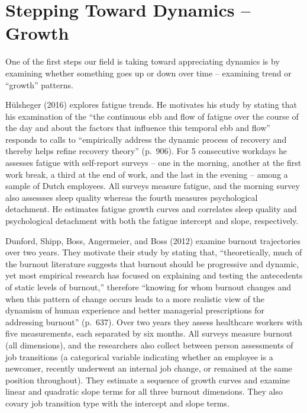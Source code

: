 \documentclass[english,,man]{apa6}
\theoremstyle{definition}
\theoremstyle{definition}
\theoremstyle{definition}
\theoremstyle{remark}
\begin{document}
\hypertarget{stepping-toward-dynamics-growth}{%
\section{Stepping Toward Dynamics --
Growth}\label{stepping-toward-dynamics-growth}}

One of the first steps our field is taking toward appreciating dynamics
is by examining whether something goes up or down over time -- examining
trend or \enquote{growth} patterns.

Hülsheger (2016) explores fatigue trends. He motivates his study by
stating that his examination of the \enquote{the continuous ebb and flow
of fatigue over the course of the day and about the factors that
influence this temporal ebb and flow} responds to calls to
\enquote{empirically address the dynamic process of recovery and thereby
helps refine recovery theory} (p.~906). For 5 consecutive workdays he
assesses fatigue with self-report surveys -- one in the morning, another
at the first work break, a third at the end of work, and the last in the
evening -- among a sample of Dutch employees. All surveys measure
fatigue, and the morning survey also assessses sleep quality whereas the
fourth measures psychological detachment. He estimates fatigue growth
curves and correlates sleep quality and psychological detachment with
both the fatigue intercept and slope, respectively.

Dunford, Shipp, Boss, Angermeier, and Boss (2012) examine burnout
trajectories over two years. They motivate their study by stating that,
\enquote{theoretically, much of the burnout literature suggests that
burnout should be progressive and dynamic, yet most empirical research
has focused on explaining and testing the antecedents of static levels
of burnout,} therefore \enquote{knowing for whom burnout changes and
when this pattern of change occurs leads to a more realistic view of the
dynamism of human experience and better managerial prescriptions for
addressing burnout} (p.~637). Over two years they assess healthcare
workers with five measurements, each separated by six months. All
surveys measure burnout (all dimensions), and the researchers also
collect between person assessments of job transitions (a categorical
variable indicating whether an employee is a newcomer, recently
underwent an internal job change, or remained at the same position
throughout). They estimate a sequence of growth curves and examine
linear and quadratic slope terms for all three burnout dimensions. They
also covary job transition type with the intercept and slope terms.
\end{document}
